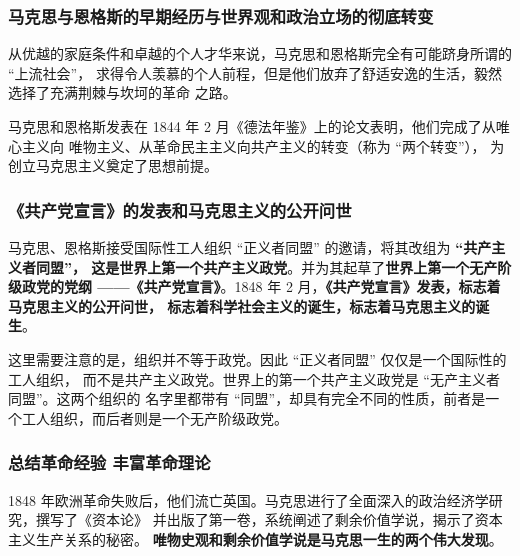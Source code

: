 \documentclass[11pt, UTF8]{book} %
\begin{document}
\subsubsection{马克思与恩格斯的早期经历与世界观和政治立场的彻底转变}

从优越的家庭条件和卓越的个人才华来说，马克思和恩格斯完全有可能跻身所谓的 “上流社会”，
求得令人羡慕的个人前程，但是他们放弃了舒适安逸的生活，毅然选择了充满荆棘与坎坷的革命
之路。

马克思和恩格斯发表在 1844 年 2 月《德法年鉴》上的论文表明，他们完成了从唯心主义向
唯物主义、从革命民主主义向共产主义的转变（称为 “两个转变”），
为创立马克思主义奠定了思想前提。

\subsubsection{《共产党宣言》的发表和马克思主义的公开问世}

马克思、恩格斯接受国际性工人组织 “正义者同盟” 的邀请，将其改组为 \textbf{“共产主义者同盟”，
这是世界上第一个共产主义政党}。并为其起草了\textbf{世界上第一个无产阶级政党的党纲
——《共产党宣言》}。1848 年 2 月，\textbf{《共产党宣言》发表，标志着马克思主义的公开问世，
标志着科学社会主义的诞生，标志着马克思主义的诞生}。
\begin{remark}
    这里需要注意的是，组织并不等于政党。因此 “正义者同盟” 仅仅是一个国际性的工人组织，
    而不是共产主义政党。世界上的第一个共产主义政党是 “无产主义者同盟”。这两个组织的
    名字里都带有 “同盟”，却具有完全不同的性质，前者是一个工人组织，而后者则是一个无产阶级政党。
\end{remark}

\subsubsection{总结革命经验 \quad 丰富革命理论}

1848 年欧洲革命失败后，他们流亡英国。马克思进行了全面深入的政治经济学研究，撰写了《资本论》
并出版了第一卷，系统阐述了剩余价值学说，揭示了资本主义生产关系的秘密。
\textbf{唯物史观和剩余价值学说是马克思一生的两个伟大发现}。
\end{document}
